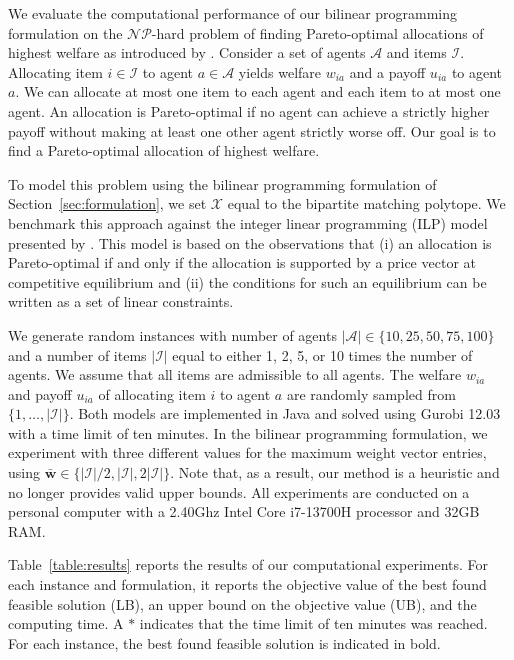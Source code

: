 \documentclass[a4paper, 11pt]{article}
\newcommand{\mc}{\mathcal}
\begin{document}
We evaluate the computational performance of our bilinear programming formulation on the $\mc{NP}$-hard problem of finding Pareto-optimal allocations of highest welfare as introduced by \citet{biro2021complexity}. Consider a set of agents $\mc{A}$ and items $\mc{I}$. Allocating item $i \in \mc{I}$ to agent $a \in \mc{A}$ yields welfare $w_{ia}$ and a payoff $u_{ia}$ to agent $a$. We can allocate at most one item to each agent and each item to at most one agent. An allocation is Pareto-optimal if no agent can achieve a strictly higher payoff without making at least one other agent strictly worse off. Our goal is to find a Pareto-optimal allocation of highest welfare.

To model this problem using the bilinear programming formulation of Section~\ref{sec:formulation}, we set $\mc{X}$ equal to the bipartite matching polytope. We benchmark this approach against the integer linear programming (ILP) model presented by \citet{biro2021complexity}. This model is based on the observations that (i) an allocation is Pareto-optimal if and only if the allocation is supported by a price vector at competitive equilibrium and (ii) the conditions for such an equilibrium can be written as a set of linear constraints. 

We generate random instances with number of agents $|\mc{A}| \in \{10, 25, 50, 75, 100\}$ and a number of items $|\mc{I}|$ equal to either 1, 2, 5, or 10 times the number of agents. We assume that all items are admissible to all agents. The welfare $w_{ia}$ and payoff $u_{ia}$ of allocating item $i$ to agent $a$ are randomly sampled from $\{1, \dots, |\mc{I}|\}$. Both models are implemented in Java and solved using Gurobi 12.03 with a time limit of ten minutes. In the bilinear programming formulation, we experiment with three different values for the maximum weight vector entries, using $\bm{\bar{w}} \in \{|\mc{I}|/2, |\mc{I}|, 2 |\mc{I}|\}$. Note that, as a result, our method is a heuristic and no longer provides valid upper bounds. All experiments are conducted on a personal computer with a 2.40Ghz Intel Core i7-13700H processor and 32GB RAM. 

Table~\ref{table:results} reports the results of our computational experiments. For each instance and formulation, it reports the objective value of the best found feasible solution (LB), an upper bound on the objective value (UB), and the computing time. A $*$ indicates that the time limit of ten minutes was reached. For each instance, the best found feasible solution is indicated in bold. 
\end{document}
